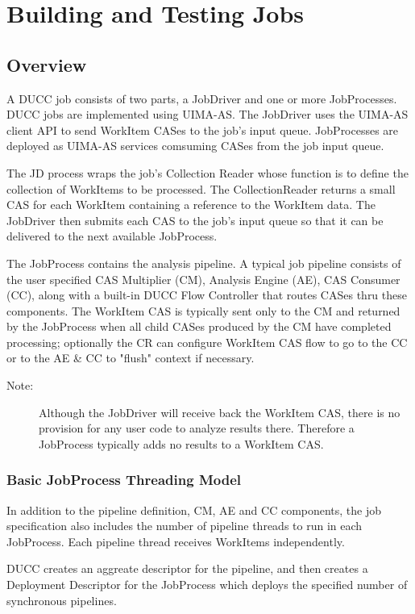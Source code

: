\chapter{Building and Testing Jobs}
\section{Overview}

A DUCC job consists of two parts, a JobDriver and one or more
JobProcesses. DUCC jobs are implemented using UIMA-AS. The JobDriver uses the UIMA-AS client
API to send WorkItem CASes to the job's input queue. JobProcesses are deployed
as UIMA-AS services comsuming CASes from the job input queue.

The JD process wraps the job's Collection Reader whose
function is to define the collection of WorkItems to be processed.
The CollectionReader returns a small CAS for each WorkItem containing a
reference to the WorkItem data. The JobDriver then submits each CAS to the job's
input queue so that it can be delivered to the next available JobProcess.

The JobProcess contains the analysis pipeline. A typical job pipeline consists
of the user specified CAS Multiplier (CM), Analysis Engine (AE), CAS
Consumer (CC), along with a built-in DUCC Flow Controller that routes CASes
thru these components. The WorkItem CAS is typically sent only to the CM and returned by
the JobProcess when all child CASes produced by the CM have completed
processing; optionally the CR can configure WorkItem CAS flow to go to the CC 
or to the AE & CC to "flush" context if necessary. 

	\begin{description}
	    \item[Note:] Although the JobDriver will receive back the WorkItem CAS, 
	    there is no provision for any user code to analyze results there. Therefore a
		JobProcess typically adds no results to a WorkItem CAS.
	\end{description}

   \subsection{Basic JobProcess Threading Model}
   In addition to the pipeline definition, CM, AE and CC components, the job
   specification also includes the number of pipeline threads to run in each
   JobProcess. Each pipeline thread receives WorkItems independently.

   DUCC creates an aggreate descriptor for the pipeline, and then creates a
   Deployment Descriptor for the JobProcess which deploys the specified number
   of synchronous pipelines.
   
